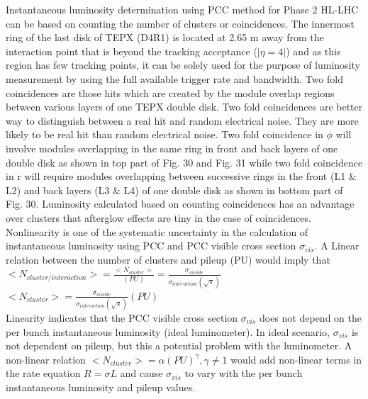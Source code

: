 Instantaneous luminosity determination using PCC method for Phase 2 HL-LHC can be based on counting the number of clusters or coincidences. The innermost ring of the last disk of TEPX (D4R1) is located at 2.65 m away from the interaction point that is beyond the tracking acceptance ($|\eta = 4|$) and as this region has few tracking points, it can be solely used for the purpose of luminosity measurement by using the full available trigger rate and bandwidth.  Two fold coincidences are those hits which are created by the module overlap regions between various layers of one TEPX double disk. Two fold coincidences are better way to distinguish between a real hit and random electrical noise. They are more likely to be real hit than random electrical noise. Two fold coincidence in $\phi$ will involve modules overlapping in the same ring in front and back layers of one double disk as shown in top part of Fig. 30 and Fig. 31 while two fold coincidence in r will require modules overlapping between successive rings in the front (L1 $\&$ L2) and back layers (L3 $\&$ L4) of one double disk as shown in bottom part of Fig. 30. Luminosity calculated based on counting coincidences has an advantage over clusters that afterglow effects are tiny in the case of coincidences. \\


Nonlinearity is one of the systematic uncertainty in the calculation of instantaneous luminosity using PCC and PCC visible cross section $\sigma_{vis}$. A Linear relation between the number of clusters and pileup (PU) would imply that\\

$<N_{cluster/interaction}> = \frac{<N_{cluster}>}{(PU)} = \frac{\sigma_{visible}}{\sigma_{interaction} (\sqrt{s})}$ \\

$<N_{cluster}> =  \frac{\sigma_{visible}}{\sigma_{interaction}(\sqrt{s})} (PU)$ \\

\newpage Linearity indicates that the PCC visible cross section $\sigma_{vis}$ does not depend on the per bunch instantaneous luminosity (ideal luminometer). In ideal  scenario, $\sigma_{vis}$ is not dependent on pileup, but this a potential problem with the luminometer. A non-linear relation $<N_{cluster}> = \alpha (PU)^{\gamma}, \gamma \neq 1$ would add non-linear terms in the rate equation $R = \sigma L$  and cause $\sigma_{vis}$ to vary with the per bunch instantaneous luminosity and pileup values.


